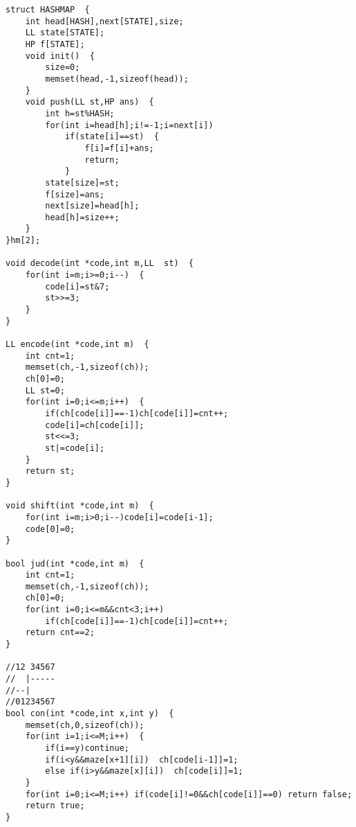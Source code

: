 \begin{verbatim}
struct HASHMAP  {  
    int head[HASH],next[STATE],size;  
    LL state[STATE];  
    HP f[STATE];  
    void init()  {  
        size=0;  
        memset(head,-1,sizeof(head));  
    }  
    void push(LL st,HP ans)  {  
        int h=st%HASH;  
        for(int i=head[h];i!=-1;i=next[i])  
            if(state[i]==st)  {  
                f[i]=f[i]+ans;  
                return;  
            }  
        state[size]=st;  
        f[size]=ans;  
        next[size]=head[h];  
        head[h]=size++;  
    }  
}hm[2];  

void decode(int *code,int m,LL  st)  {  
    for(int i=m;i>=0;i--)  {  
        code[i]=st&7;  
        st>>=3;  
    }  
}  

LL encode(int *code,int m)  {  
    int cnt=1;  
    memset(ch,-1,sizeof(ch));  
    ch[0]=0;  
    LL st=0;  
    for(int i=0;i<=m;i++)  {  
        if(ch[code[i]]==-1)ch[code[i]]=cnt++;  
        code[i]=ch[code[i]];  
        st<<=3;  
        st|=code[i];  
    }  
    return st;  
}  

void shift(int *code,int m)  {  
    for(int i=m;i>0;i--)code[i]=code[i-1];  
    code[0]=0;  
}  

bool jud(int *code,int m)  {  
    int cnt=1;  
    memset(ch,-1,sizeof(ch));  
    ch[0]=0;  
    for(int i=0;i<=m&&cnt<3;i++)  
        if(ch[code[i]]==-1)ch[code[i]]=cnt++;  
    return cnt==2;  
}  

//12 34567  
//  |-----  
//--|  
//01234567  
bool con(int *code,int x,int y)  {  
    memset(ch,0,sizeof(ch));  
    for(int i=1;i<=M;i++)  {  
        if(i==y)continue;  
        if(i<y&&maze[x+1][i])  ch[code[i-1]]=1;  
        else if(i>y&&maze[x][i])  ch[code[i]]=1;  
    }  
    for(int i=0;i<=M;i++) if(code[i]!=0&&ch[code[i]]==0) return false;  
    return true;  
}  


\end{verbatim}
